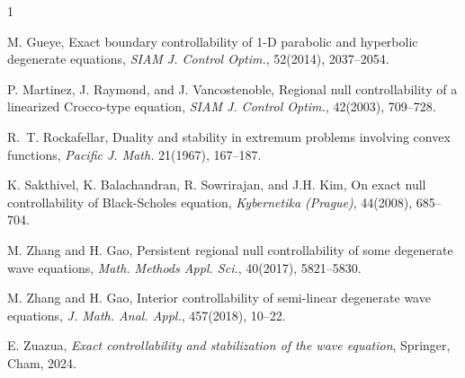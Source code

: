 \documentclass[11pt]{article}
\numberwithin{equation}{section}
\begin{document}
\begin{thebibliography}{1}
			
			
			
			 M. Gueye,  Exact boundary controllability of 1-D parabolic and hyperbolic degenerate equations,
			{\it SIAM J. Control Optim.},  52(2014), 2037--2054.
			
			
			   P. Martinez, J. Raymond,  and J. Vancostenoble,  Regional null controllability of a linearized Crocco-type equation,
			{\it  SIAM J. Control Optim.},  42(2003), 709--728.	 	
			
			 R.~T. Rockafellar, Duality and stability in extremum problems involving convex functions, {\it Pacific J. Math.} 21(1967), 167--187.
			
			  K. Sakthivel, K. Balachandran, R. Sowrirajan,  and J.H.  Kim,
			On exact null controllability of Black-Scholes equation, {\it  Kybernetika (Prague)},  44(2008), 685--704.
			
			 M. Zhang and H. Gao,  Persistent regional null controllability of some degenerate wave equations,
			{\it  Math. Methods Appl. Sci.},  40(2017),  5821--5830.	
			
			 M. Zhang and H. Gao,  Interior controllability of semi-linear degenerate wave equations,
			{\it J. Math. Anal. Appl.},  457(2018), 10--22.
			
			 E. Zuazua, {\it Exact controllability and stabilization of the wave equation},
			Springer, Cham, 2024.
			
			
			
			
			
			
			
			
			
			
		\end{thebibliography}
	
\end{document}
